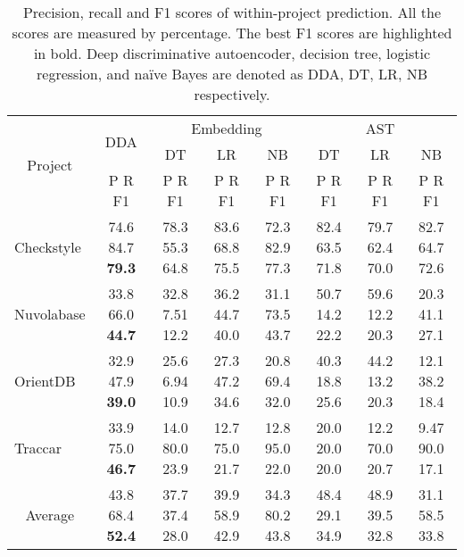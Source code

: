 \begin{table*}[t!]
	\centering
	\caption{
		Precision, recall and F1 scores of within-project prediction. All the scores are measured by percentage. The best F1 scores are highlighted in bold. Deep discriminative autoencoder, decision tree, logistic regression, and na\"{i}ve Bayes are denoted as DDA, DT, LR, NB respectively. 
	}
	\begin{adjustbox}{width=1\textwidth}
	\begin{tabular}{|c|c|c|c|c|c|c|c|}
		\hline
		\multirow{3}[6]{*}{Project} & \multirow{2}[4]{*}{DDA} & \multicolumn{3}{c|}{Embedding} & \multicolumn{3}{c|}{AST} \\
		\cline{3-8}          &       & DT    & LR    & NB    & DT    & LR    & NB \\
		\cline{2-8}          & P R F1 & P R F1 & P R F1 & P R F1 & P R F1 & P R F1 & P R F1 \\
		\hline
		\hline
		\multicolumn{1}{|l|}{Checkstyle} & 74.6 84.7 \textbf{79.3} & 78.3 55.3 64.8 & 83.6 68.8 75.5 & 72.3 82.9 77.3 & 82.4 63.5 71.8 & 79.7 62.4 70.0  & 82.7 64.7 72.6 \\

		\multicolumn{1}{|l|}{Nuvolabase} & 33.8 66.0 \textbf{44.7} & 32.8 7.51 12.2 & 36.2 44.7 40.0 & 31.1 73.5 43.7 & 50.7 14.2 22.2 & 59.6 12.2 20.3  & 20.3 41.1 27.1 \\
		
		\multicolumn{1}{|l|}{OrientDB} & 32.9 47.9 \textbf{39.0} & 25.6 6.94 10.9 & 27.3 47.2 34.6 & 20.8 69.4 32.0 & 40.3 18.8 25.6 & 44.2 13.2 20.3  & 12.1 38.2 18.4 \\
		
		\multicolumn{1}{|l|}{Traccar} & 33.9 75.0 \textbf{46.7} & 14.0 80.0 23.9 & 12.7 75.0 21.7 & 12.8 95.0 22.0 & 20.0 20.0 20.0 & 12.2 70.0 20.7  & 9.47 90.0 17.1 \\
		\hline
		\hline
		Average & 43.8 68.4 \textbf{52.4} & 37.7 37.4 28.0 & 39.9 58.9 42.9 & 34.3 80.2 43.8 & 48.4 29.1 34.9 & 48.9 39.5 32.8 & 31.1 58.5 33.8 \\
		\hline
	\end{tabular}%
	\end{adjustbox}
	\label{tab:within}%
\end{table*}%


